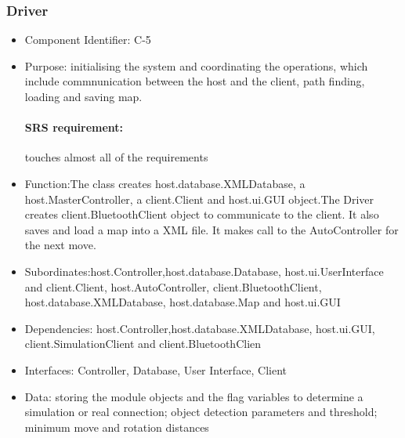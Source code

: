 \documentclass[11pt, a4paper]{report}
\begin{document}
\subsubsection{Driver}
\begin{itemize}
\item Component Identifier: C-5 
\item Purpose: initialising the system and coordinating the operations, 
which include commnunication between the host and the client, path finding,
loading and saving map.
\paragraph{SRS requirement:} touches almost all of the requirements
\item Function:The class creates host.database.XMLDatabase, a host.MasterController,
a client.Client and host.ui.GUI object.The Driver creates client.BluetoothClient object to communicate to the client. It also saves and load a map
 into a XML file. It makes call to the AutoController for the next move.
\item Subordinates:host.Controller,host.database.Database, host.ui.UserInterface and
 client.Client, host.AutoController, client.BluetoothClient,
host.database.XMLDatabase, host.database.Map and host.ui.GUI
\item Dependencies: host.Controller,host.database.XMLDatabase, host.ui.GUI,
 client.SimulationClient and client.BluetoothClien
\item Interfaces: Controller, Database, User Interface, Client
\item Data: storing the module objects and the flag variables to determine a simulation
or real connection; object detection parameters and threshold; minimum move and rotation distances 
\end{itemize}
\end{document}
